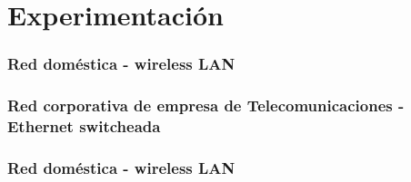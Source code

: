 \section{Experimentación}


\newpage

\subsubsection{Red doméstica - wireless LAN}

\newpage

\subsubsection{Red corporativa de empresa de Telecomunicaciones - Ethernet switcheada}

\newpage

\subsubsection{Red doméstica - wireless LAN}

\newpage